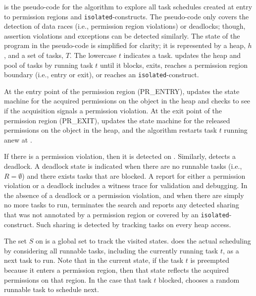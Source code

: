  is the pseudo-code for the algorithm to explore
all task schedules created at entry to permission regions and
\texttt{isolated}-constructs. The pseudo-code only covers the detection of data
races (i.e., permission region violations) or deadlocks; though, assertion violations and exceptions can be
detected similarly. The state of the program in the pseudo-code is
simplified for clarity; it is represented by a heap, $h$, and a set of
tasks, $T$. The lowercase $t$ indicates a task. 
updates the heap and pool of tasks by running task $t$ until it
blocks, exits, reaches a permission region boundary (i.e., entry or
exit), or reaches an \texttt{isolated}-construct.

At the entry point of the permission region (PR\_ENTRY), 
updates the state machine for the acquired permissions on the object in the heap and
checks to see if the acquisition signals a permission violation. At the exit
point of the permission region (PR\_EXIT),  updates the
state machine for the released permissions on the object in the heap, and the algorithm
restarts task $t$ running anew at .

If there is a permission violation, then it is detected on
. Similarly,  detects a deadlock. A
deadlock state is indicated when there are no runnable tasks (i.e.,
$R = \emptyset$) and there exists tasks that are blocked. A report
for either a permission violation or a deadlock includes a witness trace for
validation and debugging. In the absence of a deadlock or a permission violation,
and when there are simply no more tasks to run, 
terminates the search and reports any detected sharing that was not
annotated by a permission region or covered by an
\texttt{isolated}-construct. Such sharing is detected by tracking tasks on every heap access.

The set $S$ on  is a global set to track the
visited states.  does the actual scheduling by
considering all runnable tasks, including the currently
running task $t$, as a next task to run. Note that in the current
state, if the task $t$ is preempted because it enters a permission
region, then that state reflects the acquired permissions on that
region. In the case that task $t$  blocked,
 chooses a random runnable task to schedule next.

